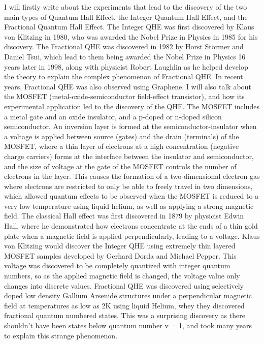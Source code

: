 \documentclass[12pt]{article}
\begin{document}
I will firstly write about the experiments that lead to the discovery of the two main types of Quantum Hall Effect, the Integer Quantum Hall Effect,
 and the Fractional Quantum Hall Effect. The Integer QHE was first discovered by Klaus von Klitzing in 1980, who was awarded the Nobel Prize in Physics 
 in 1985 for his discovery. The Fractional QHE was discovered in 1982 by Horst Störmer and Daniel Tsui, which lead to them being awarded the Nobel Prize 
 in Physics 16 years later in 1998, along with physicist Robert Laughlin as he helped develop the theory to explain the complex phenomenon of 
 Fractional QHE. In recent years, Fractional QHE was also observed using Graphene. I will also talk about the MOSFET (metal-oxide-semiconductor 
 field-effect transistor), and how its experimental application led to the discovery of the QHE. The MOSFET includes a metal gate and an oxide 
 insulator, and a p-doped or n-doped silicon semiconductor. An inversion layer is formed at the semiconductor-insulator when a voltage is applied
between source (gates) and the drain (terminals) of the MOSFET, where a thin layer of electrons at a high concentration (negative charge carriers)
forms at the interface between the insulator and semiconductor, and the size of voltage at the gate of the MOSFET controls the number of electrons
in the layer. This causes the formation of a two-dimensional electron gas where electrons are restricted to only be able to freely travel in two 
dimensions, which allowed quantum effects to be observed when the MOSFET is reduced to a very low temperature using liquid helium, as well as applying 
a strong magnetic field. The classical Hall effect was first discovered in 1879 by physicist Edwin Hall, where he demonstrated how electrons concentrate
at the ends of a thin gold plate when a magnetic field is applied perpendicularly, leading to a voltage. Klaus von Klitzing would discover the Integer
QHE using extremely thin layered MOSFET samples developed by Gerhard Dorda and Michael Pepper. This voltage was discovered to be completely quantized with
integer quantum numbers, so as the applied magnetic field is changed, the voltage value only changes into discrete values. Fractional QHE was discovered
using selectively doped low density Gallium Arsenide structures under a perpendicular magnetic field at temperatures as low as 2K using liquid Helium, 
whey they discovered fractional quantum numbered states. This was a surprising discovery as there shouldn't have been states below quantum number v = 1,
and took many years to explain this strange phenomenon. 
\end{document}
